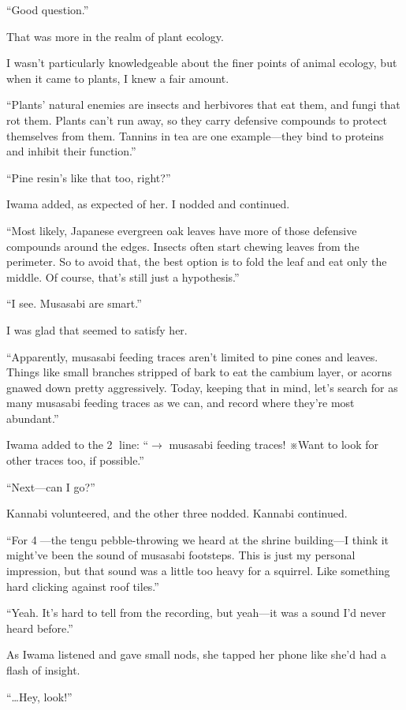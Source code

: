 \documentclass[
    a4paper,
    12pt,
    twoside,
    openany,
    UTF8,
    fontset=windows
]{ctexbook}
\begin{document}
``Good question.''

That was more in the realm of plant ecology.

I wasn't particularly knowledgeable about the finer points of animal ecology, but when it came to plants, I knew a fair amount.

``Plants' natural enemies are insects and herbivores that eat them, and fungi that rot them. Plants can't run away, so they carry defensive compounds to protect themselves from them. Tannins in tea are one example---they bind to proteins and inhibit their function.''

``Pine resin's like that too, right?''

Iwama added, as expected of her. I nodded and continued.

``Most likely, Japanese evergreen oak leaves have more of those defensive compounds around the edges. Insects often start chewing leaves from the perimeter. So to avoid that, the best option is to fold the leaf and eat only the middle. Of course, that's still just a hypothesis.''

``I see. Musasabi are smart.''

I was glad that seemed to satisfy her.

``Apparently, musasabi feeding traces aren't limited to pine cones and leaves. Things like small branches stripped of bark to eat the cambium layer, or acorns gnawed down pretty aggressively. Today, keeping that in mind, let's search for as many musasabi feeding traces as we can, and record where they're most abundant.''

Iwama added to the \textcircled{2} line: ``$\rightarrow$ musasabi feeding traces! ※Want to look for other traces too, if possible.''

``Next---can I go?''

Kannabi volunteered, and the other three nodded. Kannabi continued.

``For \textcircled{4}---the tengu pebble-throwing we heard at the shrine building---I think it might've been the sound of musasabi footsteps. This is just my personal impression, but that sound was a little too heavy for a squirrel. Like something hard clicking against roof tiles.''

``Yeah. It's hard to tell from the recording, but yeah---it was a sound I'd never heard before.''

As Iwama listened and gave small nods, she tapped her phone like she'd had a flash of insight.

``\dots Hey, look!''
\end{document}
